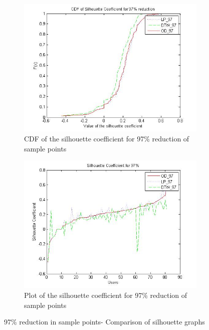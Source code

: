 \begin{itemize}
\begin{figure}
    \centering
    \begin{subfigure}[t]{.5\textwidth}
        \centering
        \includegraphics[scale=0.4]{figs/noise_97_cdf.jpg}
        \caption{CDF of the silhouette coefficient for 97\% reduction of sample points }
    \end{subfigure}%
	\begin{subfigure}[t]{.5\textwidth}
        \centering
        \includegraphics[scale=0.4]{figs/noise_97_sil.jpg}
        \caption{Plot of the silhouette coefficient for 97\% reduction of sample points}
    \end{subfigure}
    \caption{97\% reduction in sample points- Comparison of silhouette graphs}
    \label{fig:noise_97}       
\end{figure}
\end{itemize}
